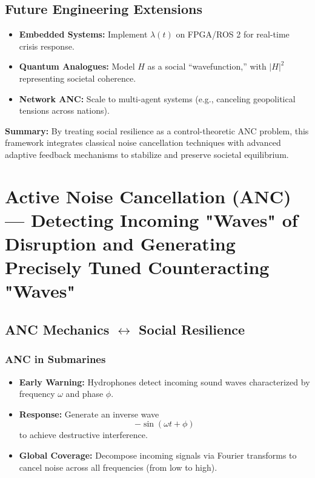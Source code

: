 \documentclass{article}
\theoremstyle{definition}
\begin{document}
\subsection{Future Engineering Extensions}
\begin{itemize}
    \item \textbf{Embedded Systems:} Implement \( \lambda(t) \) on FPGA/ROS 2 for real-time crisis response.
    \item \textbf{Quantum Analogues:} Model \( H \) as a social ``wavefunction,'' with \( |H|^2 \) representing societal coherence.
    \item \textbf{Network ANC:} Scale to multi-agent systems (e.g., canceling geopolitical tensions across nations).
\end{itemize}

\textbf{Summary:} By treating social resilience as a control-theoretic ANC problem, this framework integrates classical noise cancellation techniques with advanced adaptive feedback mechanisms to stabilize and preserve societal equilibrium.

\section{Active Noise Cancellation (ANC) --- Detecting Incoming "Waves" of Disruption and Generating Precisely Tuned Counteracting "Waves"}

\subsection{ANC Mechanics $\leftrightarrow$ Social Resilience}

\subsubsection{ANC in Submarines}
\begin{itemize}
    \item \textbf{Early Warning:} Hydrophones detect incoming sound waves characterized by frequency $\omega$ and phase $\phi$.
    \item \textbf{Response:} Generate an inverse wave 
    \[
    -\sin(\omega t + \phi)
    \]
    to achieve destructive interference.
    \item \textbf{Global Coverage:} Decompose incoming signals via Fourier transforms to cancel noise across all frequencies (from low to high).
\end{itemize}
\end{document}
